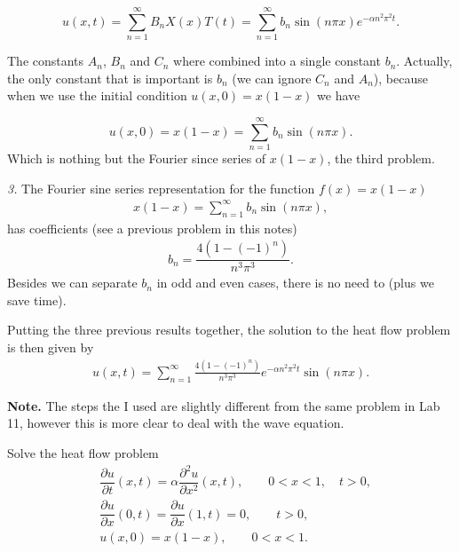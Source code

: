 \documentclass[11pt]{article}
\begin{document}
\begin{solution}
\[u(x,t)=\sum_{n=1}^{\infty} B_{n}X(x)T(t)=\sum_{n=1}^{\infty} b_{n} \sin (n\pi x) e^{-\alpha n^{2}\pi^{2} t}.\]

The constants $A_{n}$, $B_{n}$ and $C_{n}$ where combined into a single constant $b_{n}$. Actually, the only constant that is important is $b_{n}$ (we can ignore $C_{n}$ and $A_{n}$), because when we use the initial condition $u(x,0)=x(1-x)$ we have

\[u(x,0)= x(1-x) = \sum_{n=1}^{\infty} b_{n} \sin (n\pi x).\]
Which is nothing but the Fourier since series of $x(1-x)$, the third problem.

\textsl{3. } The Fourier sine series representation for the function $f(x)=x(1-x)$ 
\begin{eqnarray*}
x(1-x) = \sum_{n=1}^{\infty} b_{n} \sin(n\pi x),
\end{eqnarray*}
has coefficients (see a previous problem in this notes)
\begin{eqnarray*}
\boxed{b_{n} = \dfrac{4(1-(-1)^n)}{n^3 \pi^3}}.
\end{eqnarray*}
Besides we can separate $b_{n}$ in odd and even cases, there is no need to (plus we save time).

Putting the three previous results together, the solution to the heat flow problem is then given by
\begin{eqnarray*}
\boxed{u(x,t) = \sum_{n=1}^{\infty}\frac{4(1-(-1)^{n})}{n^{3}\pi^{3}}e^{-\alpha n^{2}\pi^{2}t}\sin (n\pi x)}.
\end{eqnarray*}

\textbf{Note.} The steps the I used are slightly different from the same problem in Lab 11, however this is more clear to deal with the wave equation.

\end{solution}





\begin{problem}
Solve the heat flow problem
\begin{equation*} \begin{split}
& \dfrac{\partial u }{\partial t } (x,t) = \alpha \dfrac{\partial^2 u}{\partial x^2}(x,t), \qquad 0<x<1, \quad t>0, \\
& \dfrac{\partial u }{\partial x } (0,t) = \dfrac{\partial u }{\partial x } (1,t)=0, \qquad t>0, \\
& u(x,0) = x(1-x), \qquad 0<x<1.
\end{split}\end{equation*}
\end{problem}
\end{document}
